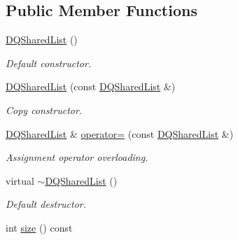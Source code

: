 \subsection*{Public Member Functions}
\begin{DoxyCompactItemize}
\item 
\hypertarget{classDQSharedList_ac744350c26425fe34b086a4e11878786}{
\hyperlink{classDQSharedList_ac744350c26425fe34b086a4e11878786}{DQSharedList} ()}
\label{classDQSharedList_ac744350c26425fe34b086a4e11878786}

\begin{DoxyCompactList}\small\item\em Default constructor. \item\end{DoxyCompactList}\item 
\hypertarget{classDQSharedList_a073a7e7765b36a4ecf36f8ac84d4d661}{
\hyperlink{classDQSharedList_a073a7e7765b36a4ecf36f8ac84d4d661}{DQSharedList} (const \hyperlink{classDQSharedList}{DQSharedList} \&)}
\label{classDQSharedList_a073a7e7765b36a4ecf36f8ac84d4d661}

\begin{DoxyCompactList}\small\item\em Copy constructor. \item\end{DoxyCompactList}\item 
\hypertarget{classDQSharedList_abd4b456858ade5c41e2f9e8ec6b95733}{
\hyperlink{classDQSharedList}{DQSharedList} \& \hyperlink{classDQSharedList_abd4b456858ade5c41e2f9e8ec6b95733}{operator=} (const \hyperlink{classDQSharedList}{DQSharedList} \&)}
\label{classDQSharedList_abd4b456858ade5c41e2f9e8ec6b95733}

\begin{DoxyCompactList}\small\item\em Assignment operator overloading. \item\end{DoxyCompactList}\item 
\hypertarget{classDQSharedList_a5a2bd0a17551291c8c2b16d8c2fa0509}{
virtual \hyperlink{classDQSharedList_a5a2bd0a17551291c8c2b16d8c2fa0509}{$\sim$DQSharedList} ()}
\label{classDQSharedList_a5a2bd0a17551291c8c2b16d8c2fa0509}

\begin{DoxyCompactList}\small\item\em Default destructor. \item\end{DoxyCompactList}\item 
\hypertarget{classDQSharedList_a7686c471ce10b212b120ac2676d466e8}{
int \hyperlink{classDQSharedList_a7686c471ce10b212b120ac2676d466e8}{size} () const }
\label{classDQSharedList_a7686c471ce10b212b120ac2676d466e8}


\end{DoxyCompactItemize}
